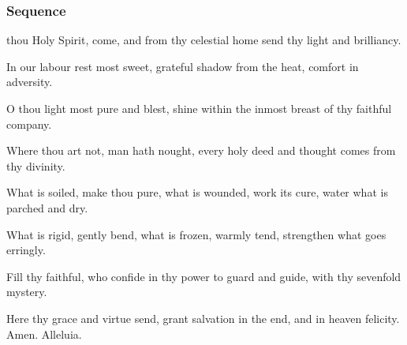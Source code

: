 
\clearpage
\subsubsection{Sequence}\label{WhitSeq}
 thou Holy Spirit, come, and from thy celestial home send thy light and brilliancy.

In our labour rest most sweet, grateful shadow from the heat, comfort in adversity.

O thou light most pure and blest, shine within the inmost breast of thy faithful company.

Where thou art not, man hath nought, every holy deed and thought comes from thy divinity.

What is soiled, make thou pure, what is wounded, work its cure, water what is parched and dry.

What is rigid, gently bend, what is frozen, warmly tend, strengthen what goes erringly.

Fill thy faithful, who confide in thy power to guard and guide, with thy sevenfold mystery.

Here thy grace and virtue send, grant salvation in the end, and in heaven felicity. Amen. Alleluia.

